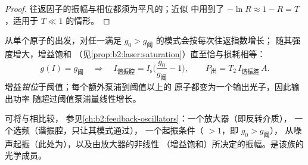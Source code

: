 \begin{proof}
往返因子的振幅与相位都须为平凡的；近似
中用到了 $-\ln R \approx 1 - R = T$，适用于 $T \ll 1$ 的情形。
\end{proof}

\begin{proposition}[阈值以上的稳态]\label{prop:b2:laser:steady}
从单个原子的出发，对任一满足
$g_0 > g_{\text{阈}}$ 的模式会按每次往返指数增长；
随其强度增大，增益饱和
（见\cref{prop:b2:laser:saturation}）直至恰与损耗相等：
\[
g(I) = g_{\text{阈}} \quad\Longrightarrow\quad
I_{\text{谐振腔}} = I_{\text{s}}\Big(\frac{g_0}{g_{\text{阈}}} - 1\Big),
\qquad P_{\text{出}} = T_2\,I_{\text{谐振腔}}\,A .
\]
增益\emph{钳位}于阈值；每个额外泵浦到阈值以上的
原子都变为一个输出光子，因此输出功率
随超过阈值泵浦量线性增长。
\end{proposition}

\begin{remark}[激光器是一种反馈振荡器]\label{rem:b2:laser:feedback}
可将与相比较，
参见\cref{ch:b2:feedback-oscillators}：一个放大器（即反转介质），
一个选频（谐振腔，只让其模式通过），
一个起振条件（ $> 1$，即 $g_0 > g_{\text{阈}}$），
从噪声起振（此处为），以及由放大器的非线性
（增益饱和）所决定的振幅。是该族的
光学成员。
\end{remark}

